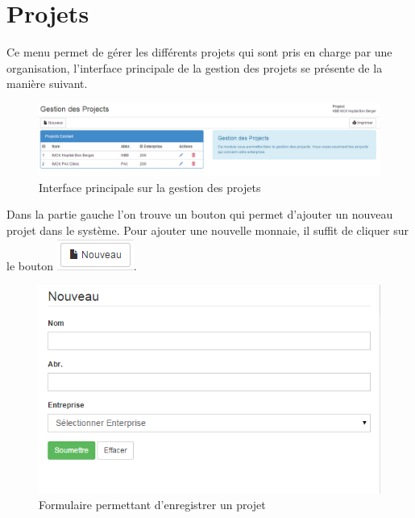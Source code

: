 \documentclass[12pt,a4paper]{report}
\begin{document}
\section{Projets}
Ce menu permet de gérer les différents projets qui sont pris en charge par une organisation, l'interface principale de la gestion des projets se présente de la manière suivant.

\begin{figure}[h]
\begin{center}
\includegraphics[width=16cm]{pic/AdminProject.png}
\end{center}
\caption{Interface principale sur la gestion des projets}
\label{Interface principale sur la gestion des projets}
\end{figure}


Dans la partie gauche l'on trouve un bouton qui permet d'ajouter un nouveau projet dans le système. Pour ajouter une nouvelle monnaie, il suffit de cliquer sur le bouton \includegraphics[scale=0.7]{pic/NewProject.png}.

\begin{figure}[h]
\begin{center}
\includegraphics[width=13cm]{pic/FormNewProj.png}
\end{center}
\caption{Formulaire permettant d'enregistrer un projet}
\label{Formulaire permettant d'enregistrer un projet}
\end{figure}
\end{document}
